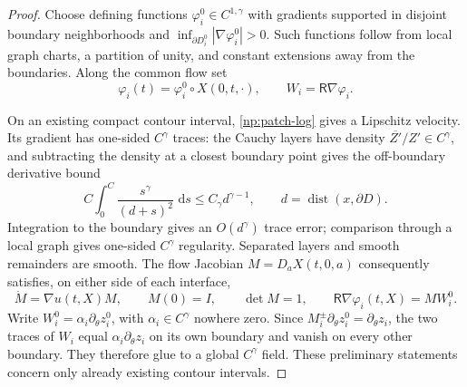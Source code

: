\documentclass[11pt]{amsart}
\theoremstyle{remark}
\numberwithin{equation}{section}
\newcommand{\dd}{\,\mathrm d}
\begin{document}
\begin{proof}
Choose defining functions $\varphi_i^0\in C^{1,\gamma}$ with
gradients supported in disjoint boundary neighborhoods and
$\inf_{\partial D_i^0}|\nabla\varphi_i^0|>0$. Such functions
follow from local graph charts, a partition of unity, and constant
extensions away from the boundaries. Along the common flow set
\[
 \varphi_i(t)=\varphi_i^0\circ X(0,t,\cdot),\qquad
 W_i=\mathsf R\nabla\varphi_i.
\]

On an existing compact contour interval,
\eqref{np:patch-log} gives a Lipschitz velocity. Its gradient has
one-sided $C^\gamma$ traces: the Cauchy layers have density
$\overline{Z'}/Z'\in C^\gamma$, and subtracting the density at a
closest boundary point gives the off-boundary derivative bound
\[
 C\int_0^C\frac{s^\gamma}{(d+s)^2}\,\dd s
       \le C_\gamma d^{\gamma-1},\qquad
 d=\operatorname{dist}(x,\partial D).
\]
Integration to the boundary gives an $O(d^\gamma)$ trace error;
comparison through a local graph gives one-sided $C^\gamma$
regularity. Separated layers and smooth remainders are smooth.
The flow Jacobian $M=D_aX(t,0,a)$ consequently satisfies, on
either side of each interface,
\[
 \dot M=\nabla u(t,X)M,\qquad M(0)=I,\qquad\det M=1,
 \qquad \mathsf R\nabla\varphi_i(t,X)=MW_i^0.
\]
Write $W_i^0=\alpha_i\partial_\theta z_i^0$, with
$\alpha_i\in C^\gamma$ nowhere zero. Since
$M_i^\pm\partial_\theta z_i^0=\partial_\theta z_i$,
the two traces of $W_i$ equal
$\alpha_i\partial_\theta z_i$ on its own boundary and vanish
on every other boundary. They therefore glue to a global
$C^\gamma$ field. These preliminary statements concern only
already existing contour intervals.


\end{proof}
\end{document}
